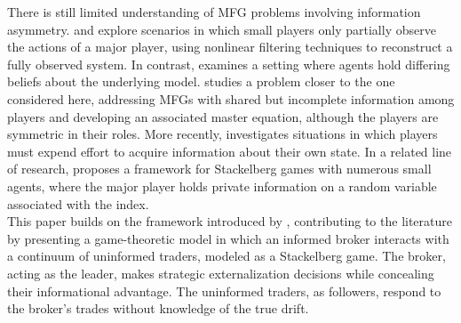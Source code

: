 \documentclass[10pt]{article}
\begin{document}
There is still limited understanding of MFG problems involving information asymmetry. \citeauthor{sen2016mean} \cite{sen2016mean} and \citeauthor{firoozi2020epsilon} \cite{firoozi2020epsilon} explore scenarios in which small players only partially observe the actions of a major player, using nonlinear filtering techniques to reconstruct a fully observed system. In contrast, \citeauthor{casgrain2020mean} \cite{casgrain2020mean} examines a setting where agents hold differing beliefs about the underlying model. \citeauthor{bertucci2022mean} \cite{bertucci2022mean} studies a problem closer to the one considered here, addressing MFGs with shared but incomplete information among players and developing an associated master equation, although the players are symmetric in their roles. More recently, \citeauthor{becherer2023mean} \cite{becherer2023mean} investigates situations in which players must expend effort to acquire information about their own state. In a related line of research, \citeauthor{bergault2024mfg} \cite{bergault2024mfg} proposes a framework for Stackelberg games with numerous small agents, where the major player holds private information on a random variable associated with the index.\\


This paper builds on the framework introduced by \citeauthor{bergault2024mfg} \cite{bergault2024mfg}, contributing to the literature by presenting a game-theoretic model in which an informed broker interacts with a continuum of uninformed traders, modeled as a Stackelberg game. The broker, acting as the leader, makes strategic externalization decisions while concealing their informational advantage. The uninformed traders, as followers, respond to the broker’s trades without knowledge of the true drift.\\
\end{document}
